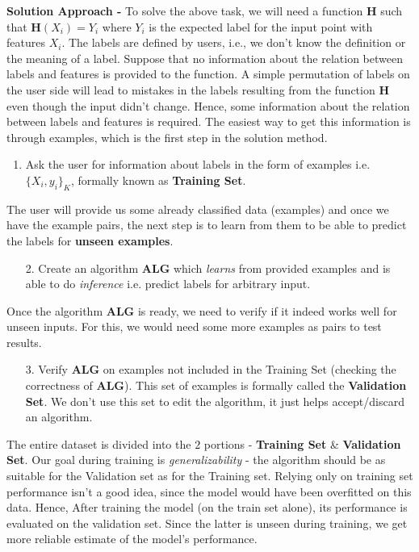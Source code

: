 \documentclass[12pt]{article}
\begin{document}
\noindent\textbf{Solution Approach - }To solve the above task, we will need a function $\mathbf{H}$ such that $\mathbf{H}(X_i) = Y_i$ where $Y_i$ is the expected label for the input point with features $X_i$. The labels are defined by users, i.e., we don't know the definition or the meaning of a label. Suppose that no information about the relation between labels and features is provided to the function. A simple permutation of labels on the user side will lead to mistakes in the labels resulting from the function $\mathbf{H}$ even though the input didn't change. Hence, some information about the relation between labels and features is required. The easiest way to get this information is through examples, which is the first step in the solution method.
\begin{enumerate}
    \item Ask the user for information about labels in the form of examples i.e. $\{X_i, y_i\}_K$, formally known as \textbf{Training Set}.
\end{enumerate}
The user will provide us some already classified data (examples) and once we have the example pairs, the next step is to learn from them to be able to predict the labels for \textbf{unseen examples}.
\begin{enumerate}
    \item[2.] Create an algorithm \textbf{ALG} which \textit{learns} from provided examples and is able to do \textit{inference} i.e. predict labels for arbitrary input.
\end{enumerate}
Once the algorithm \textbf{ALG} is ready, we need to verify if it indeed works well for unseen inputs. For this, we would need some more examples as pairs to test results.
\begin{enumerate}
    \item[3.] Verify \textbf{ALG} on examples not included in the Training Set (checking the correctness of \textbf{ALG}). This set of examples is formally called the \textbf{Validation Set}. We don't use this set to edit the algorithm, it just helps accept/discard an algorithm.
\end{enumerate}
The entire  dataset is divided into the $2$ portions - \textbf{Training Set} \& \textbf{Validation Set}. Our goal during training is \textit{generalizability} - the algorithm should be as suitable for the Validation set as for the Training set. Relying only on training set performance isn't a good idea, since the model would have been overfitted on this data. Hence, After training the model (on the train set alone), its performance is evaluated on the validation set. Since the latter is unseen during training, we get more reliable estimate of the model's performance.

%

\end{document}
